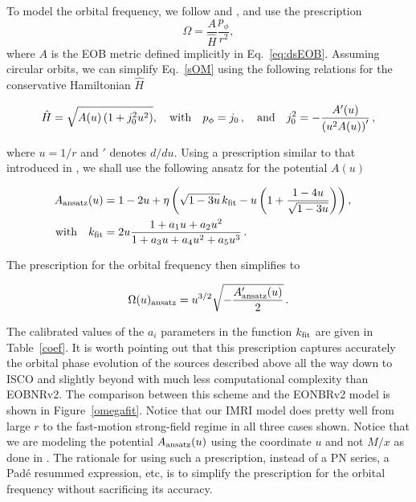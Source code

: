  To model the orbital frequency, we follow \cite{rev} and \cite{bernu}, and use the prescription
\begin{equation}
\Omega=\frac{A}{\hat{H}}\frac{p_{\phi}}{r^2},
\label{sOM}
\end{equation}
where $A$ is the EOB metric defined implicitly in Eq.~\ref{eq:dsEOB}.
Assuming circular orbits, we can simplify Eq.~\eqref{sOM} using the following relations for the conservative Hamiltonian $\hat{H}$

\begin{equation}
\hat{H}=\sqrt{A(u)\left(1+j_0^2 u^2\right)}, \quad {\rm with} \quad p_\phi=j_0\,, \quad {\rm and} \quad j_0^2=-\frac{A'(u)}{\left(u^2A(u)\right)'}\,,
\label{assum}
\end{equation}
 
\noindent where \(u=1/r\) and \('\) denotes \(d/du\). Using a prescription similar to that introduced in \cite{barus}, we shall use the following ansatz for the potential \(A(u)\)

\begin{equation}
\begin{split}
A_{\rm ansatz}(u) &= 1-2u+\eta\left( \sqrt{1-3u}\,k_{\rm fit} -u \left(1+\frac{1-4u}{\sqrt{1-3u}}\right)\right), \quad \\
{\rm with} \quad k_{\rm fit} &= 2u\frac{1+a_1u+a_2 u^2}{1+a_3 u +a_4 u^2 + a_5 u^3}\,.
\end{split}
\label{ansatz}
\end{equation}

\noindent The prescription for the orbital frequency then simplifies to

\begin{equation}
\Omega(u)_{\rm ansatz}= u^{3/2}\sqrt{-\frac{A'_{\rm ansatz}(u)}{2}}\,.
\label{ompres}
\end{equation}

\noindent The calibrated values of the \(a_i\) parameters in the function \(k_{\rm fit}\) are given in Table~\ref{coef}. It is worth pointing out that this prescription captures accurately the orbital phase evolution of the sources described above all the way down to ISCO and slightly beyond with much less computational complexity than EOBNRv2.  The comparison between this scheme and the EONBRv2 model is shown in Figure~\ref{omegafit}. Notice that our IMRI model does pretty well from large \(r\) to the fast-motion strong-field regime in all three cases shown.
Notice that we are modeling the potential  \(A_{\rm ansatz}(u)\) using the coordinate \(u\) and not \(M/x\) as done in \cite{barus}.
The rationale for using such a prescription, instead of a PN series,%
a Pad\'e resummed expression, etc, is to simplify the prescription for the orbital 
frequency without sacrificing its accuracy.
 


